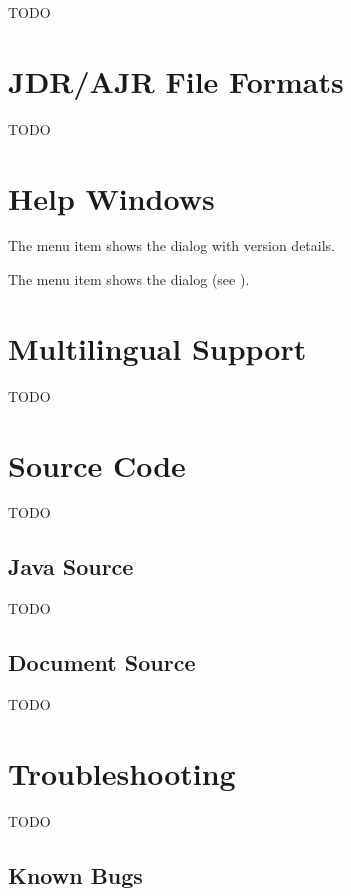 TODO


\chapter{JDR/AJR File Formats}\label{sec:jdrajrformat}

TODO


\chapter{Help Windows}
\label{sec:helpwindows}


The  menu item shows the 
dialog with version details.


The  menu item shows the 
dialog (see ).



\chapter{Multilingual Support}\label{sec:multilingualsupport}

TODO


\chapter{Source Code}\label{sec:sourcecode}

TODO


\section{Java Source}\label{sec:javasource}

TODO


\section{Document Source}\label{sec:docsource}

TODO


\chapter{Troubleshooting}\label{sec:troubleshooting}

TODO


\section{Known Bugs}\label{sec:knownbugs}

